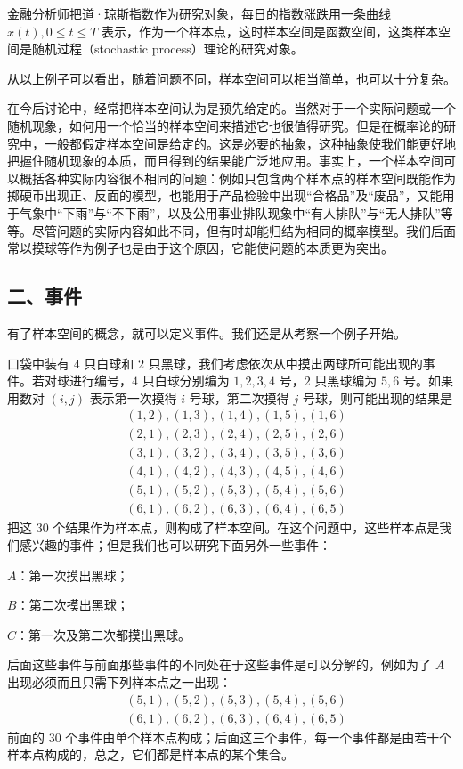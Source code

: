 \documentclass[../../main.tex]{subfiles}
\begin{document}
\begin{example}[道·琼斯指数]\label{example:ch01-道琼斯指数}
金融分析师把道·琼斯指数作为研究对象，每日的指数涨跌用一条曲线 $x(t),0\leqslant t\leqslant T$ 表示，作为一个样本点，这时样本空间是函数空间，这类样本空间是随机过程（stochastic process）理论的研究对象。
\end{example}

从以上例子可以看出，随着问题不同，样本空间可以相当简单，也可以十分复杂。

在今后讨论中，经常把样本空间认为是预先给定的。当然对于一个实际问题或一个随机现象，如何用一个恰当的样本空间来描述它也很值得研究。但是在概率论的研究中，一般都假定样本空间是给定的。这是必要的抽象，这种抽象使我们能更好地把握住随机现象的本质，而且得到的结果能广泛地应用。事实上，一个样本空间可以概括各种实际内容很不相同的问题：例如只包含两个样本点的样本空间既能作为掷硬币出现正、反面的模型，也能用于产品检验中出现“合格品”及“废品”，又能用于气象中“下雨”与“不下雨”，以及公用事业排队现象中“有人排队”与“无人排队”等等。尽管问题的实际内容如此不同，但有时却能归结为相同的概率模型。我们后面常以摸球等作为例子也是由于这个原因，它能使问题的本质更为突出。

\subsection*{二、事件}

有了样本空间的概念，就可以定义事件。我们还是从考察一个例子开始。

\begin{example}[摸球问题]\label{example:ch01-摸球}
口袋中装有 $4$ 只白球和 $2$ 只黑球，我们考虑依次从中摸出两球所可能出现的事件。若对球进行编号，$4$ 只白球分别编为 $1,2,3,4$ 号，$2$ 只黑球编为 $5,6$ 号。如果用数对 $(i,j)$ 表示第一次摸得 $i$ 号球，第二次摸得 $j$ 号球，则可能出现的结果是
\begin{align*}
&(1,2),(1,3),(1,4),(1,5),(1,6)\\
&(2,1),(2,3),(2,4),(2,5),(2,6)\\
&(3,1),(3,2),(3,4),(3,5),(3,6)\\
&(4,1),(4,2),(4,3),(4,5),(4,6)\\
&(5,1),(5,2),(5,3),(5,4),(5,6)\\
&(6,1),(6,2),(6,3),(6,4),(6,5)
\end{align*}
把这 $30$ 个结果作为样本点，则构成了样本空间。在这个问题中，这些样本点是我们感兴趣的事件；但是我们也可以研究下面另外一些事件：

$A$：第一次摸出黑球；

$B$：第二次摸出黑球；

$C$：第一次及第二次都摸出黑球。

后面这些事件与前面那些事件的不同处在于这些事件是可以分解的，例如为了 $A$ 出现必须而且只需下列样本点之一出现：
\begin{align*}
&(5,1),(5,2),(5,3),(5,4),(5,6)\\
&(6,1),(6,2),(6,3),(6,4),(6,5)
\end{align*}
前面的 $30$ 个事件由单个样本点构成；后面这三个事件，每一个事件都是由若干个样本点构成的，总之，它们都是样本点的某个集合。
\end{example}
\end{document}
